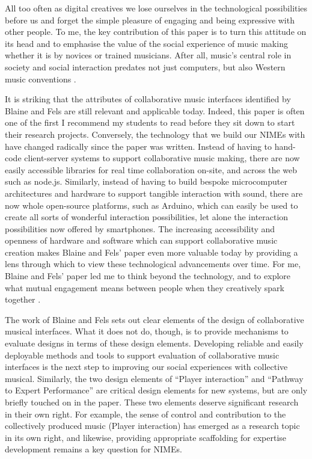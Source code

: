 All too often as digital creatives we lose ourselves in the technological possibilities before us and forget the simple pleasure of engaging and being expressive with other people. To me, the key contribution of this paper is to turn this attitude on its head and to emphasise the value of the social experience of music making whether it is by novices or trained musicians. After all, music's central role in society and social interaction predates not just computers, but also Western music conventions \cite{Titon:1996}.

It is striking that the attributes of collaborative music interfaces identified by Blaine and Fels are still relevant and applicable today. Indeed, this paper is often one of the first I recommend my students to read before they sit down to start their research projects. Conversely, the technology that we build our NIMEs with have changed radically since the paper was written. Instead of having to hand-code client-server systems to support collaborative music making, there are now easily accessible libraries for real time collaboration on-site, and across the web such as node.js. Similarly, instead of having to build bespoke microcomputer architectures and hardware to support tangible interaction with sound, there are now whole open-source platforms, such as Arduino, which can easily be used to create all sorts of wonderful interaction possibilities, let alone the interaction possibilities now offered by smartphones. The increasing accessibility and openness of hardware and software which can support collaborative music creation makes Blaine and Fels' paper even more valuable today by providing a lens through which to view these technological advancements over time. For me, Blaine and Fels' paper led me to think beyond the technology, and to explore what mutual engagement means between people when they creatively spark together \cite{Bryan-Kinns:2009}.

The work of Blaine and Fels sets out clear elements of the design of collaborative musical interfaces. What it does not do, though, is to provide mechanisms to evaluate designs in terms of these design elements. Developing reliable and easily deployable methods and tools to support evaluation of collaborative music interfaces is the next step to improving our social experiences with collective musical. Similarly, the two design elements of ``Player interaction'' and ``Pathway to Expert Performance'' are critical design elements for new systems, but are only briefly touched on in the paper. These two elements deserve significant research in their own right. For example, the sense of control and contribution to the collectively produced music (Player interaction) has emerged as a research topic in its own right, and likewise, providing appropriate scaffolding for expertise development remains a key question for NIMEs.

